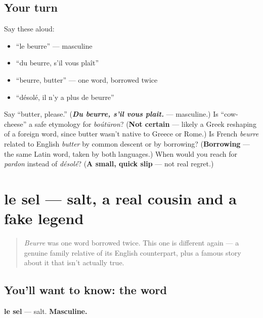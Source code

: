 \subsection*{Your turn}
Say these aloud:

\begin{itemize}
\raggedright
  \item \textquotedblleft{}le beurre\textquotedblright{} — masculine
  \item \textquotedblleft{}du beurre, s'il vous plaît\textquotedblright{}
  \item \textquotedblleft{}beurre, butter\textquotedblright{} — one word, borrowed twice
  \item \textquotedblleft{}désolé, il n'y a plus de beurre\textquotedblright{}
\end{itemize}

\begin{tcolorbox}[breakable,colback=teal!4,colframe=teal!35!black,title={Before you move on}]
Say \textquotedblleft{}butter, please.\textquotedblright{} (\emph{\textbf{Du beurre, s'il vous plaît.}} — masculine.) Is \textquotedblleft{}cow-cheese\textquotedblright{} a safe etymology for \emph{boútūron}? (\textbf{Not certain} — likely a Greek reshaping of a foreign word, since butter wasn't native to Greece or Rome.) Is French \emph{beurre} related to English \emph{butter} by common descent or by borrowing? (\textbf{Borrowing} — the same Latin word, taken by both languages.) When would you reach for \emph{pardon} instead of \emph{désolé}? (\textbf{A small, quick slip} — not real regret.)
\end{tcolorbox}
\section[le sel]{le sel — salt, a real cousin and a fake legend}

\label{lesson:FR-C30-sel}



\begin{quote}
\emph{Beurre} was one word borrowed twice. This one is different again — a genuine family relative of its English counterpart, plus a famous story about it that isn't actually true.
\end{quote}

\subsection*{You'll want to know: the word}
\textbf{le sel} — salt. \textbf{Masculine.}

